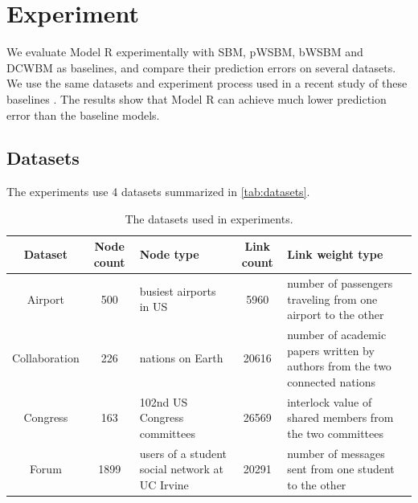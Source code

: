 \documentclass[conference]{IEEEtran}
\begin{document}
\section{Experiment}
We evaluate Model R experimentally with SBM, pWSBM, bWSBM and DCWBM as baselines,
and compare their prediction errors on several datasets.
We use the same datasets and experiment process used in a recent study of these baselines \cite{aicher2014learning}.
The results show 
that Model R can achieve much lower prediction error than the baseline models.

\subsection{Datasets}
The experiments use 4 datasets summarized in \autoref{tab:datasets}.
\begin{table}[!htb]\centering
	\caption{The datasets used in experiments.}
	\begin{tabularx}{\textwidth}{|c|c|X|c|X|}  \hline \rowcolor{blue!40}
		Dataset & Node count & Node type & Link count & Link weight type \\ \hline
		Airport\cite{colizza2007reaction} & 500 & busiest airports in US & 5960 & number of passengers traveling from one airport to the other\\ \hline
		Collaboration\cite{pan2012world} & 226 & nations on Earth & 20616 & number of academic papers written by authors from the two connected nations \\ \hline
		Congress\cite{porter2005network} & 163  & 102nd US Congress committees & 26569 & interlock value of shared members from the two committees \\ \hline
		Forum\cite{opsahl2009clustering}  & 1899 & users of a student social network at UC Irvine & 20291 & number of messages sent from one student to the other \\ \hline
	\end{tabularx}
	\label{tab:datasets}
\end{table}
\end{document}
